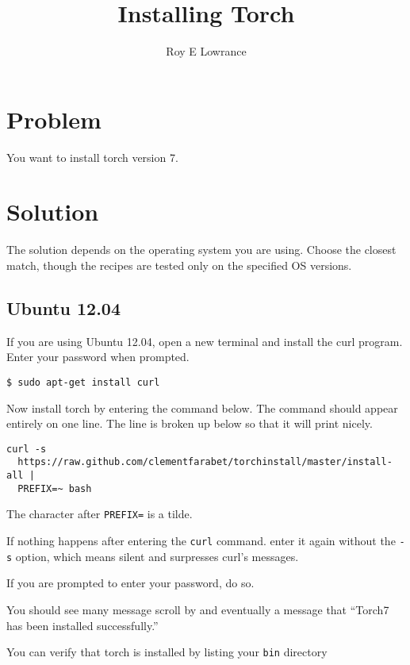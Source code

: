 \documentclass{article}
\let\code\texttt %
\begin{document}
\title{Installing Torch}
\author{Roy E Lowrance}
\maketitle


\section{Problem}
You want to install torch version 7.

\section{Solution}

The solution depends on the operating system you are using. Choose the
closest match, though the recipes are tested only on the specified OS
versions.

\subsection{Ubuntu 12.04}

If you are using Ubuntu 12.04, open a new terminal and install the curl
program. Enter your password when prompted.

\begin{verbatim}
$ sudo apt-get install curl
\end{verbatim}

Now install torch by entering the command below. The command should
appear entirely on one line. The line is broken up below so that it will
print nicely.

\begin{verbatim}
curl -s
  https://raw.github.com/clementfarabet/torchinstall/master/install-all | 
  PREFIX=~ bash
\end{verbatim}

The character after \code{PREFIX=} is a tilde.

If nothing happens after entering the \code{curl} command. enter it
again without the \code{-s} option, which means silent and surpresses
curl's messages.

If you are prompted to enter your password, do so.

You should see many message scroll by and eventually a message that ``Torch7 has
been installed successfully.''

You can verify that torch is installed by listing your \code{bin} directory
\end{document}
